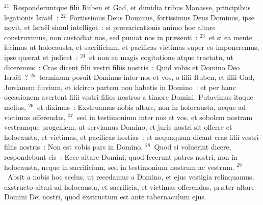 ${}^{21}$~Responderuntque filii Ruben et Gad, et dimidia tribus Manasse, principibus legationis Isra\"el~:
${}^{22}$~Fortissimus Deus Dominus, fortissimus Deus Dominus, ipse novit, et Isra\"el simul intelliget~: si pr\ae varicationis animo hoc altare construximus, non custodiat nos, sed puniat nos in pr\ae senti~:
${}^{23}$~et si ea mente fecimus ut holocausta, et sacrificium, et pacificas victimas super eo imponeremus, ipse qu\ae rat et judicet~:
${}^{24}$~et non ea magis cogitatione atque tractatu, ut diceremus~: Cras dicent filii vestri filiis nostris~: Quid vobis et Domino Deo Isra\"el~?
${}^{25}$~terminum posuit Dominus inter nos et vos, o filii Ruben, et filii Gad, Jordanem fluvium, et idcirco partem non habetis in Domino~: et per hanc occasionem avertent filii vestri filios nostros a timore Domini. Putavimus itaque melius,
${}^{26}$~et diximus~: Exstruamus nobis altare, non in holocausta, neque ad victimas offerendas,
${}^{27}$~sed in testimonium inter nos et vos, et sobolem nostram vestramque progeniem, ut serviamus Domino, et juris nostri sit offerre et holocausta, et victimas, et pacificas hostias~: et nequaquam dicant cras filii vestri filiis nostris~: Non est vobis pars in Domino.
${}^{28}$~Quod si voluerint dicere, respondebunt eis~: Ecce altare Domini, quod fecerunt patres nostri, non in holocausta, neque in sacrificium, sed in testimonium nostrum ac vestrum.
${}^{29}$~Absit a nobis hoc scelus, ut recedamus a Domino, et ejus vestigia relinquamus, exstructo altari ad holocausta, et sacrificia, et victimas offerendas, pr\ae ter altare Domini Dei nostri, quod exstructum est ante tabernaculum ejus.



